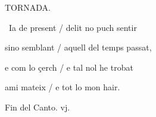 \documentclass[12pt]{article}
\begin{document}
\begin{estrofaExtra}%




\begin{tornada}

TORNADA.

\end{tornada}


\end{estrofaExtra}


\begin{estrofa}

 \textparagraph\  Ia de present / delit no puch sentir

 sino semblant / aquell del temps passat,

 e com lo \c{c}erch / e tal nol he trobat

 ami mateix / e tot lo mon hair.

\end{estrofa}



\begin{estrofaExtra}%

\begin{final}

Fin del Canto. vj.

\end{final}

\end{estrofaExtra}
\end{document}
